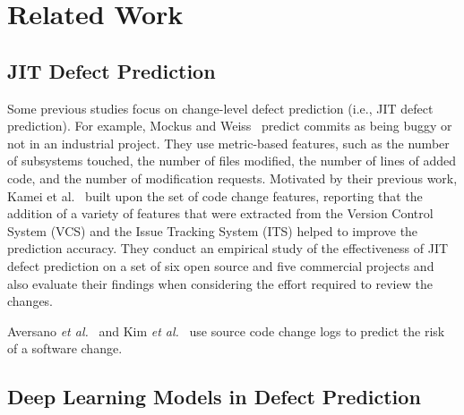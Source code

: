 \section{Related Work}
\label{sec:related}
\subsection{JIT Defect Prediction}
Some previous studies focus on change-level defect prediction (i.e., JIT defect prediction). For example, Mockus and Weiss~\cite{Mockus2000} predict commits as being buggy or not in an industrial project. They use metric-based features, such as the number of subsystems touched, the number of files modified, the number of lines of added code, and the number of modification requests. Motivated by their previous work, Kamei et al.~\cite{Kamei:2013:LES} built upon the set of code change features, reporting that the addition of a variety of features that were extracted from the Version Control System (VCS) and the Issue Tracking System (ITS) helped to improve the prediction accuracy. They conduct an empirical study of the effectiveness of JIT defect prediction on a set of six open source and five commercial projects and also evaluate their findings when considering the effort required to review the changes.

Aversano \emph{et al.}~\cite{Aversano2007} and Kim \emph{et al.}~\cite{Kim2008} use source code change logs to predict the risk of a software change.


\subsection{Deep Learning Models in Defect Prediction}




